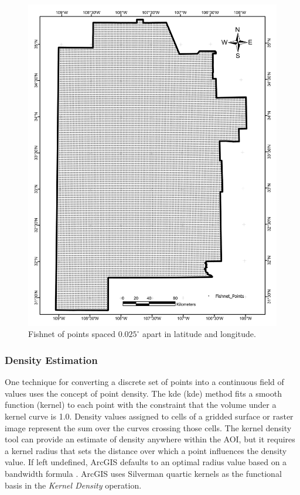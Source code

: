 \begin{figure}[htp]
\centering
\includegraphics[scale=.50]{templates/images/Figure-Fishnet.pdf}
\caption[Fishnet point mesh]{Fishnet of points spaced $0.025^\circ$ apart in latitude and longitude.} 
\label{fig:fishnet}
\end{figure}

\subsubsection{Density Estimation}

One technique for converting a discrete set of points into a continuous field of values uses the concept of point density. The \acrlong{kde} (\acrshort{kde}) method fits a smooth function (kernel) to each point with the constraint that the volume under a kernel curve is 1.0. Density values assigned to cells of a gridded surface or raster image represent the sum over the curves crossing those cells. The kernel density tool can provide an estimate of density anywhere within the AOI, but it requires a kernel radius that sets the distance over which a point influences the density value. If left undefined, ArcGIS defaults to an optimal radius value based on a bandwidth formula \citep{esri_how_2021-3}. ArcGIS uses Silverman quartic kernels \citep{esri_how_2021-3,silverman_density_1986} as the functional basis in the \textit{Kernel Density} operation.

